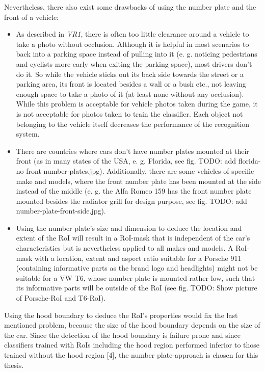 Nevertheless, there also exist some drawbacks of using the number plate and the front of a vehicle:

\begin{itemize}
  \item As described in \emph{VR1}, there is often too little clearance around a vehicle to take a photo without occlusion. Although it is helpful in most scenarios to back into a parking space instead of pulling into it (e. g. noticing pedestrians and cyclists more early when exiting the parking space), most drivers don't do it. So while the vehicle sticks out its back side towards the street or a parking area, its front is located besides a wall or a bush etc., not leaving enough space to take a photo of it (at least none without any occlusion). While this problem is acceptable for vehicle photos taken during the game, it is not acceptable for photos taken to train the classifier. Each object not belonging to the vehicle itself decreases the performance of the recognition system.
  \item There are countries where cars don't have number plates mounted at their front (as in many states of the USA, e. g. Florida, see fig. TODO: add florida-no-front-number-plates.jpg). Additionally, there are some vehicles of specific make and models, where the front number plate has been mounted at the side instead of the middle (e. g. the Alfa Romeo 159 has the front number plate mounted besides the radiator grill for design purpose, see fig. TODO: add number-plate-front-side.jpg).
  \item Using the number plate's size and dimension to deduce the location and extent of the RoI will result in a RoI-mask that is independent of the car's characteristics but is nevertheless applied to all makes and models. A RoI-mask with a location, extent and aspect ratio suitable for a Porsche 911 (containing informative parts as the brand logo and headlights) might not be suitable for a VW T6, whose number plate is mounted rather low, such that its informative parts will be outside of the RoI (see fig. TODO: Show picture of Porsche-RoI and T6-RoI).
\end{itemize}

Using the hood boundary to deduce the RoI’s properties would fix the last mentioned problem, because the size of the hood boundary depends on the size of the car. Since the detection of the hood boundary is failure prone and since classifiers trained with RoIs including the hood region performed inferior to those trained without the hood region [4], the number plate-approach is chosen for this thesis.


